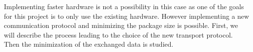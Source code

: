 Implementing faster hardware is not a possibility in this case as one of the goals for this project is to only use the existing hardware.
However implementing a new communication protocol and minimizing the package size is possible. First, we will describe the process leading to the choice of the new transport protocol. Then the minimization of the exchanged data is studied.

